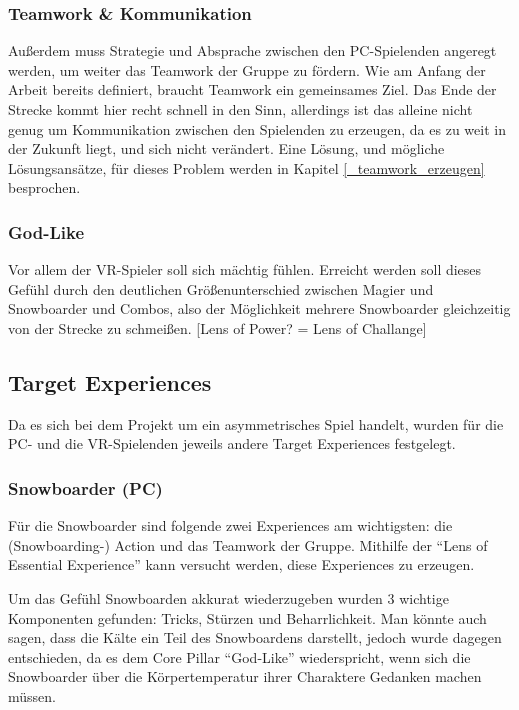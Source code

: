 \subsubsection{Teamwork \& Kommunikation}
Außerdem muss Strategie und Absprache zwischen den PC-Spielenden angeregt werden, um weiter das Teamwork der Gruppe zu fördern. Wie am Anfang der Arbeit bereits definiert, braucht Teamwork ein gemeinsames Ziel. Das Ende der Strecke kommt hier recht schnell in den Sinn, allerdings ist das alleine nicht genug um Kommunikation zwischen den Spielenden zu erzeugen, da es zu weit in der Zukunft liegt, und sich nicht verändert. Eine Lösung, und mögliche Lösungsansätze, für dieses Problem werden in Kapitel \ref{_teamwork_erzeugen} besprochen.

\subsubsection{God-Like}
Vor allem der VR-Spieler soll sich mächtig fühlen. Erreicht werden soll dieses Gefühl durch den deutlichen Größenunterschied zwischen Magier und Snowboarder und Combos, also der Möglichkeit mehrere Snowboarder gleichzeitig von der Strecke zu schmeißen.
[Lens of Power? = Lens of Challange]

\subsection{Target Experiences}

Da es sich bei dem Projekt um ein asymmetrisches Spiel handelt, wurden für die PC- und die VR-Spielenden jeweils andere Target Experiences festgelegt.

\subsubsection{Snowboarder (PC)}
Für die Snowboarder sind folgende zwei Experiences am wichtigsten: die (Snowboarding-) Action und das Teamwork der Gruppe. Mithilfe der "`Lens of Essential Experience"'\cite[S. 55]{_art_of_gamedesign} kann versucht werden, diese Experiences zu erzeugen.

Um das Gefühl Snowboarden akkurat wiederzugeben wurden 3 wichtige Komponenten gefunden: Tricks, Stürzen und Beharrlichkeit. Man könnte auch sagen, dass die Kälte ein Teil des Snowboardens darstellt, jedoch wurde dagegen entschieden, da es dem Core Pillar "`God-Like"' wiederspricht, wenn sich die Snowboarder über die Körpertemperatur ihrer Charaktere Gedanken machen müssen.

